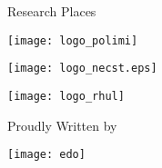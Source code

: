       \hspace{.1\textwidth}%
      \begin{minipage}[t]{.35\textwidth}
            \begin{flushleft}
                  {\Large \textsf{Research Places}}

                  \vspace*{1em}

                  \texttt{[image: logo\_polimi]}

                  \vspace{1em}

                  \texttt{[image: logo\_necst.eps]}

                  \vspace{1em}

                  \texttt{[image: logo\_rhul]}

                  \vspace*{2em}

                  {\sffamily Proudly Written by}

                  \vspace{.8em}

                  \texttt{[image: edo]}

                  \vspace{.5em}


            \end{flushleft}
            \begin{center}
            \end{center}

      \end{minipage}
    \vfill
